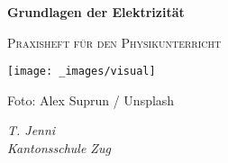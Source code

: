 
\begin{titlepage}
    \centering

    \vspace*{2.5cm}

    {\Huge\bfseries Grundlagen der Elektrizität \par}
    \vspace{0.5cm}
    {\Large\scshape Praxisheft für den Physikunterricht \par}

    \vspace{1.5cm}
    \texttt{[image: \_images/visual]}

    {Foto: Alex Suprun / Unsplash \par}

    \vfill

    {\large\itshape T. Jenni\\
    Kantonsschule Zug \par}

    \vspace{1cm}
    {\large \mydate \par}


\end{titlepage}
